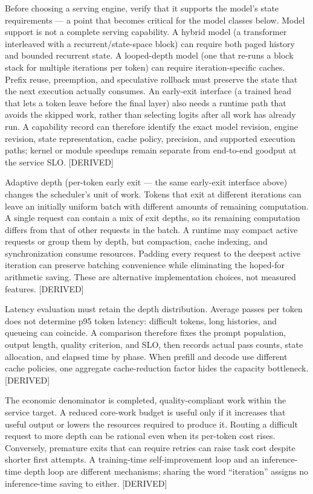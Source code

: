 Before choosing a serving engine, verify that it supports the model's
state requirements --- a point that becomes critical for the model
classes below. Model support is not a complete serving capability. A
hybrid model (a transformer interleaved with a recurrent/state-space
block) can require both paged history and bounded recurrent state. A
looped-depth model (one that re-runs a block stack for multiple
iterations per token) can require iteration-specific caches. Prefix
reuse, preemption, and speculative rollback must preserve the state that
the next execution actually consumes. An early-exit interface (a trained
head that lets a token leave before the final layer) also needs a
runtime path that avoids the skipped work, rather than selecting logits
after all work has already run. A capability record can therefore
identify the exact model revision, engine revision, state
representation, cache policy, precision, and supported execution paths;
kernel or module speedups remain separate from end-to-end goodput at the
service SLO. \mbox{{[}DERIVED{]}}

Adaptive depth (per-token early exit --- the same early-exit interface
above) changes the scheduler's unit of work. Tokens that exit at
different iterations can leave an initially uniform batch with different
amounts of remaining computation. A single request can contain a mix of
exit depths, so its remaining computation differs from that of other
requests in the batch. A runtime may compact active requests or group
them by depth, but compaction, cache indexing, and synchronization
consume resources. Padding every request to the deepest active iteration
can preserve batching convenience while eliminating the hoped-for
arithmetic saving. These are alternative implementation choices, not
measured features. \mbox{{[}DERIVED{]}}

Latency evaluation must retain the depth distribution. Average passes
per token does not determine p95 token latency: difficult tokens, long
histories, and queueing can coincide. A comparison therefore fixes the
prompt population, output length, quality criterion, and SLO, then
records actual pass counts, state allocation, and elapsed time by phase.
When prefill and decode use different cache policies, one aggregate
cache-reduction factor hides the capacity bottleneck. \mbox{{[}DERIVED{]}}

The economic denominator is completed, quality-compliant work within the
service target. A reduced core-work budget is useful only if it
increases that useful output or lowers the resources required to produce
it. Routing a difficult request to more depth can be rational even when
its per-token cost rises. Conversely, premature exits that can require
retries can raise task cost despite shorter first attempts. A
training-time self-improvement loop and an inference-time depth loop are
different mechanisms; sharing the word ``iteration'' assigns no
inference-time saving to either. \mbox{{[}DERIVED{]}}

